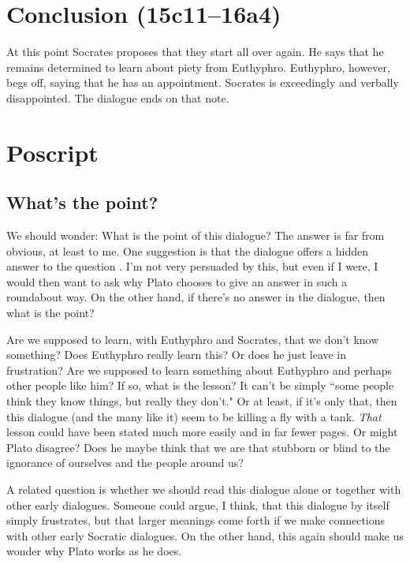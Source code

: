 \documentclass[11pt]{article}
\begin{document}


\section{Conclusion (15c11--16a4)}

At this point Socrates proposes that they start all over again.  He says
that he remains determined to learn about piety from Euthyphro.  Euthyphro,
however, begs off, saying that he has an appointment.  Socrates is
exceedingly and verbally disappointed.  The dialogue ends on that note.


\section{Poscript}

\subsection{What's the point?}

We should wonder: What is the point of this dialogue?  The answer is far
from obvious, at least to me.  One suggestion is that the dialogue offers
a hidden answer to the question .  I'm not very
persuaded by this, but even if I were, I would then want to ask why Plato
chooses to give an answer in such a roundabout way.  On the other hand, if
there's no answer in the dialogue, then what is the point?

Are we supposed to learn, with Euthyphro and Socrates, that we don't know
something?  Does Euthyphro really learn this?  Or does he just leave in
frustration?  Are we supposed to learn something about Euthyphro and
perhaps other people like him?  If so, what is the lesson?  It can't be
simply ``some people think they know things, but really they don't."  Or at
least, if it's only that, then this dialogue (and the many like it) seem to
be killing a fly with a tank.  \emph{That} lesson could have been stated
much more easily and in far fewer pages.  Or might Plato disagree?  Does he
maybe think that we are that stubborn or blind to the ignorance of
ourselves and the people around us?

A related question is whether we should read this dialogue alone or
together with other early dialogues.  Someone could argue, I think, that
this dialogue by itself simply frustrates, but that larger meanings come
forth if we make connections with other early Socratic dialogues.  On the
other hand, this again should make us wonder why Plato works as he does.
\end{document}
